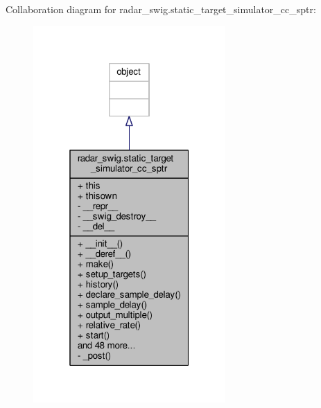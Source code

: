 Collaboration diagram for radar\+\_\+swig.\+static\+\_\+target\+\_\+simulator\+\_\+cc\+\_\+sptr\+:
\nopagebreak
\begin{figure}[H]
\begin{center}
\leavevmode
\includegraphics[width=208pt]{d5/dd4/classradar__swig_1_1static__target__simulator__cc__sptr__coll__graph}
\end{center}
\end{figure}
